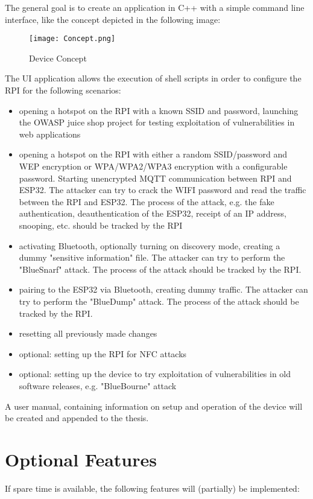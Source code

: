 \documentclass{article}
\begin{document}
The general goal is to create an application in C++ with a simple command line interface, like the concept depicted in the following image:

\vfill

\begin{figure}[H]
    \centering
    \texttt{[image: Concept.png]}
    \caption{Device Concept}
    \label{fig:image1}
\end{figure}

The UI application allows the execution of shell scripts in order to configure the RPI for the following scenarios:

\begin{itemize}
	\item opening a hotspot on the RPI with a known SSID and password, launching the OWASP juice shop project for testing exploitation of vulnerabilities in web applications 
	\item opening a hotspot on the RPI with either a random SSID/password and WEP encryption or WPA/WPA2/WPA3 encryption with a configurable password. 
    Starting unencrypted MQTT communication between RPI and ESP32. 
    The attacker can try to crack the WIFI password and read the traffic between the RPI and ESP32. 
    The process of the attack, e.g. the fake authentication, deauthentication of the ESP32, receipt of an IP address, snooping, etc. should be tracked by the RPI 
    \item activating Bluetooth, optionally turning on discovery mode, creating a dummy "sensitive information" file. The attacker can try to perform the "BlueSnarf" attack. 
    The process of the attack should be tracked by the RPI.
	\item pairing to the ESP32 via Bluetooth, creating dummy traffic. The attacker can try to perform the "BlueDump" attack.
    The process of the attack should be tracked by the RPI.
	\item resetting all previously made changes
	\item optional: setting up the RPI for NFC attacks
	\item optional: setting up the device to try exploitation of vulnerabilities in old software releases, e.g. "BlueBourne" attack 
\end{itemize}

A user manual, containing information on setup and operation of the device will be created and appended to the thesis.


\section{Optional Features}
    If spare time is available, the following features will (partially) be implemented:
\end{document}
